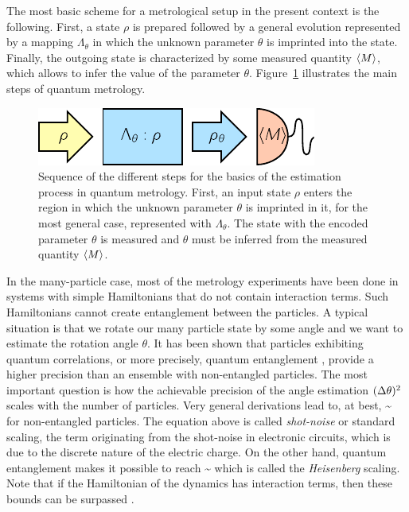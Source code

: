 The most basic scheme for a metrological setup in the present context is the following.
First, a state $\rho$ is prepared followed by a general evolution represented by a mapping $\Lambda_{\theta}$ in which the unknown parameter $\theta$ is imprinted into the state.
Finally, the outgoing state is characterized by some measured quantity $\langle{M}\rangle$, which allows to infer the value of the parameter $\theta$.
Figure~\ref{fig:bg-preparation-encoding-estimation} illustrates the main steps of quantum metrology.
\begin{figure}[htp]
  \centering
  \includegraphics[scale=1.2]{img/BG_preparation_encoding_estimation.pdf}
  \caption[The estimation process in quantum metrology]{
  Sequence of the different steps for the basics of the estimation process in quantum metrology. First, an input state $\rho$ enters the region in which the unknown parameter $\theta$ is imprinted in it, for the most general case, represented with $\Lambda_{\theta}$. The state with the encoded parameter $\theta$ is measured and $\theta$ must be inferred from the measured quantity $\langle{M}\rangle$.}
  \label{fig:bg-preparation-encoding-estimation}
\end{figure}

In the many-particle case, most of the metrology experiments have been done in systems with simple Hamiltonians that do not contain interaction terms.
Such Hamiltonians cannot create entanglement between the particles.
A typical situation is that we rotate our many particle state by some angle and we want to estimate the rotation angle $\theta$.
It has been shown that particles exhibiting quantum correlations, or more precisely, quantum entanglement \cite{Guehne2009, Luis2004}, provide a higher precision than an ensemble with non-entangled particles.
The most important question is how the achievable precision of the angle estimation $(\Delta \theta )^2$ scales with the number of particles.
Very general derivations lead to, at best,
\be
  \label{eq:bg-shot-noise-scaling}
  \varian{\theta}\sim {}
\ee
for non-entangled particles.
The equation above is called \emph{shot-noise} or standard scaling, the term originating from the shot-noise in electronic circuits, which is due to the discrete nature of the electric charge.
On the other hand, quantum entanglement makes it possible to reach
\be
  \label{eq:bg-heisenberg-scaling}
  \varian{\theta}\sim {}
\ee
which is called the \emph{Heisenberg} scaling.
Note that if the Hamiltonian of the dynamics has interaction terms, then these bounds can be surpassed \cite{Luis2004, Napolitano2011, Boixo2007, Braun2011, Roy2008, Choi2008, Rey2007}.

